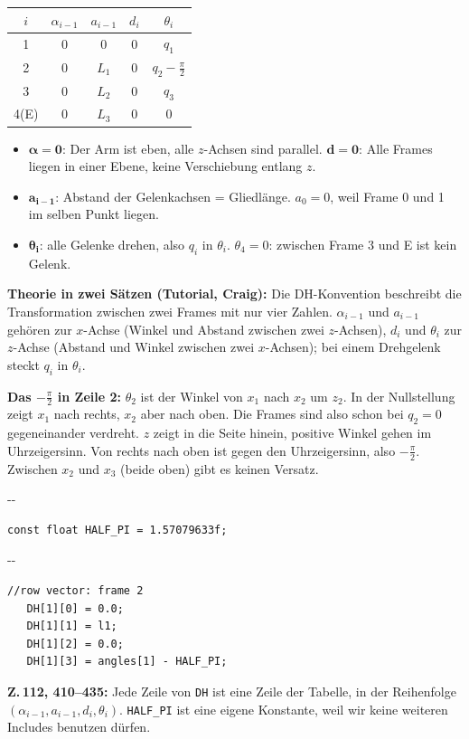 \documentclass[10pt,a4paper]{article}
\makeatletter
\newcommand{\secneed}[1]{\par\penalty\@M\begingroup\setlength{\dimen@}{#1}\dimen@ii\pagegoal
  \advance\dimen@ii-\pagetotal\ifdim\dimen@>\dimen@ii\ifdim\dimen@ii>\z@\vfil\fi\penalty-\@M\fi\endgroup}
\newcommand{\code}[1]{\texttt{#1}}
\makeatother
\begin{document}
\begin{center}
\begin{tabular}{ccccc}
  \toprule
  $i$ & $\alpha_{i-1}$ & $a_{i-1}$ & $d_i$ & $\theta_i$ \\
  \midrule
  1    & 0 & 0     & 0 & $q_1$ \\
  2    & 0 & $L_1$ & 0 & $q_2 - \frac{\pi}{2}$ \\
  3    & 0 & $L_2$ & 0 & $q_3$ \\
  4(E) & 0 & $L_3$ & 0 & 0 \\
  \bottomrule
\end{tabular}
\end{center}
\vspace{-6pt}
\begin{itemize}
  \item $\boldsymbol{\alpha = 0}$: Der Arm ist eben, alle $z$-Achsen sind parallel. $\boldsymbol{d = 0}$: Alle Frames
        liegen in einer Ebene, keine Verschiebung entlang $z$.
  \item $\boldsymbol{a_{i-1}}$: Abstand der Gelenkachsen = Gliedlänge. $a_0 = 0$, weil Frame 0 und 1 im selben Punkt liegen.
  \item $\boldsymbol{\theta_i}$: alle Gelenke drehen, also $q_i$ in $\theta_i$. $\theta_4 = 0$: zwischen Frame 3 und E
        ist kein Gelenk.
\end{itemize}

\textbf{Theorie in zwei Sätzen (Tutorial, Craig):} Die DH-Konvention beschreibt die Transformation zwischen zwei Frames
mit nur vier Zahlen. $\alpha_{i-1}$ und $a_{i-1}$ gehören zur $x$-Achse (Winkel und Abstand zwischen zwei $z$-Achsen),
$d_i$ und $\theta_i$ zur $z$-Achse (Abstand und Winkel zwischen zwei $x$-Achsen); bei einem Drehgelenk steckt $q_i$ in
$\theta_i$.

\textbf{Das $-\frac{\pi}{2}$ in Zeile 2:} $\theta_2$ ist der Winkel von $x_1$ nach $x_2$ um $z_2$. In der Nullstellung zeigt
$x_1$ nach rechts, $x_2$ aber nach oben. Die Frames sind also schon bei $q_2 = 0$ gegeneinander verdreht. $z$ zeigt in die
Seite hinein, positive Winkel gehen im Uhrzeigersinn. Von \glqq rechts\grqq{} nach \glqq oben\grqq{} ist gegen den
Uhrzeigersinn, also $-\frac{\pi}{2}$. Zwischen $x_2$ und $x_3$ (beide oben) gibt es keinen Versatz.

\secneed{2\baselineskip}
\begin{lstlisting}[firstnumber=112]
const float HALF_PI = 1.57079633f;
\end{lstlisting}
\vspace{-4pt}
\secneed{6\baselineskip}
\begin{lstlisting}[firstnumber=418]
   //row vector: frame 2
   DH[1][0] = 0.0;
   DH[1][1] = l1;
   DH[1][2] = 0.0;
   DH[1][3] = angles[1] - HALF_PI;
\end{lstlisting}
\textbf{Z.\,112, 410--435:} Jede Zeile von \code{DH} ist eine Zeile der Tabelle, in der Reihenfolge
$(\alpha_{i-1}, a_{i-1}, d_i, \theta_i)$. \code{HALF\_PI} ist eine eigene Konstante, weil wir keine weiteren Includes
benutzen dürfen.
\end{document}
